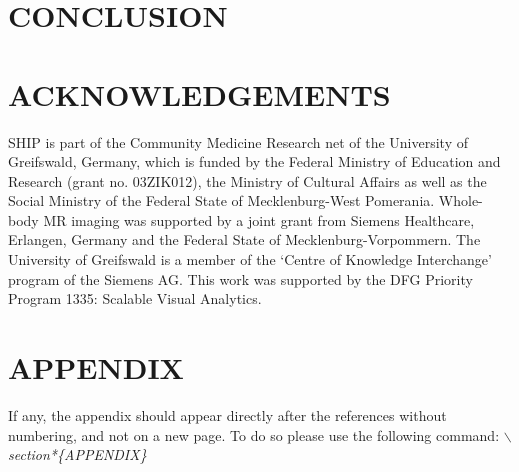 \documentclass[a4paper,twoside]{style/article}
\begin{document}
\section{\uppercase{Conclusion}}
\label{sec:Conclusion}

\section*{\uppercase{Acknowledgements}}

\noindent SHIP is part of the Community Medicine Research net of the University of Greifswald, Germany, which is funded by the Federal Ministry of Education and Research (grant no. 03ZIK012), the Ministry of Cultural Affairs as well as the Social Ministry of the Federal State of Mecklenburg-West Pomerania. Whole-body MR imaging was supported by a joint grant from Siemens Healthcare, Erlangen, Germany and the Federal State of Mecklenburg-Vorpommern. The University of Greifswald is a member of the ‘Centre of Knowledge Interchange’ program of the Siemens AG. This work was supported by the DFG Priority Program 1335: Scalable Visual Analytics.


\vfill

{\small
}


\section*{\uppercase{Appendix}}

\noindent If any, the appendix should appear directly after the
references without numbering, and not on a new page. To do so please use the following command:
\textit{$\backslash$section*\{APPENDIX\}}

\vfill
\end{document}

